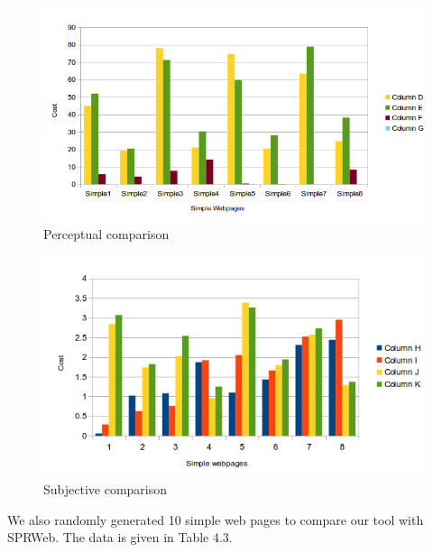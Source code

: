 \begin{figure}[!htb]
  \centering
  \includegraphics[width=\linewidth]{SimpleGP.png}
  \caption{Perceptual comparison}
  \label{fig:sub1}
\end{figure}

\begin{figure}[!htb]
  \centering
  \includegraphics[width=\linewidth]{simpleGS.png}
  \caption{Subjective comparison}
  \label{fig:sub2}
\end{figure}


We also randomly generated 10 simple web pages to compare our tool with SPRWeb. The data is given in Table 4.3.

